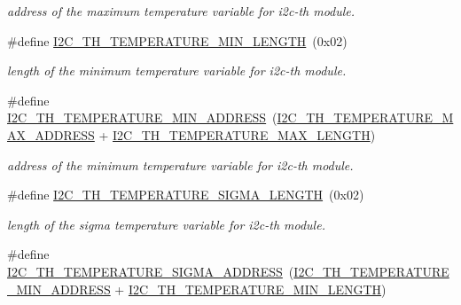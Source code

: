 \begin{DoxyCompactItemize}
\begin{DoxyCompactList}\small\item\em address of the maximum temperature variable for i2c-\/th module. \end{DoxyCompactList}\item 
\mbox{\label{registers-th_8h_a6d360f6fa8df3c5d6f52758de9a24c11}} 
\#define \hyperlink{registers-th_8h_a6d360f6fa8df3c5d6f52758de9a24c11}{I2\+C\+\_\+\+T\+H\+\_\+\+T\+E\+M\+P\+E\+R\+A\+T\+U\+R\+E\+\_\+\+M\+I\+N\+\_\+\+L\+E\+N\+G\+TH}~(0x02)
\begin{DoxyCompactList}\small\item\em length of the minimum temperature variable for i2c-\/th module. \end{DoxyCompactList}\item 
\mbox{\label{registers-th_8h_a7481bfd98d8da5c9977dfd2f06fc963c}} 
\#define \hyperlink{registers-th_8h_a7481bfd98d8da5c9977dfd2f06fc963c}{I2\+C\+\_\+\+T\+H\+\_\+\+T\+E\+M\+P\+E\+R\+A\+T\+U\+R\+E\+\_\+\+M\+I\+N\+\_\+\+A\+D\+D\+R\+E\+SS}~(\hyperlink{registers-th_8h_a6d5b14a0e8a228589bdb9ece79d757fd}{I2\+C\+\_\+\+T\+H\+\_\+\+T\+E\+M\+P\+E\+R\+A\+T\+U\+R\+E\+\_\+\+M\+A\+X\+\_\+\+A\+D\+D\+R\+E\+SS} + \hyperlink{registers-th_8h_a919ba5b2f1aea01d8b48ac119d705552}{I2\+C\+\_\+\+T\+H\+\_\+\+T\+E\+M\+P\+E\+R\+A\+T\+U\+R\+E\+\_\+\+M\+A\+X\+\_\+\+L\+E\+N\+G\+TH})
\begin{DoxyCompactList}\small\item\em address of the minimum temperature variable for i2c-\/th module. \end{DoxyCompactList}\item 
\mbox{\label{registers-th_8h_adb95f4cc071476c164346dc15de2dd1a}} 
\#define \hyperlink{registers-th_8h_adb95f4cc071476c164346dc15de2dd1a}{I2\+C\+\_\+\+T\+H\+\_\+\+T\+E\+M\+P\+E\+R\+A\+T\+U\+R\+E\+\_\+\+S\+I\+G\+M\+A\+\_\+\+L\+E\+N\+G\+TH}~(0x02)
\begin{DoxyCompactList}\small\item\em length of the sigma temperature variable for i2c-\/th module. \end{DoxyCompactList}\item 
\mbox{\label{registers-th_8h_a13174bfc9826a2360b3a9ef42c682415}} 
\#define \hyperlink{registers-th_8h_a13174bfc9826a2360b3a9ef42c682415}{I2\+C\+\_\+\+T\+H\+\_\+\+T\+E\+M\+P\+E\+R\+A\+T\+U\+R\+E\+\_\+\+S\+I\+G\+M\+A\+\_\+\+A\+D\+D\+R\+E\+SS}~(\hyperlink{registers-th_8h_a7481bfd98d8da5c9977dfd2f06fc963c}{I2\+C\+\_\+\+T\+H\+\_\+\+T\+E\+M\+P\+E\+R\+A\+T\+U\+R\+E\+\_\+\+M\+I\+N\+\_\+\+A\+D\+D\+R\+E\+SS} + \hyperlink{registers-th_8h_a6d360f6fa8df3c5d6f52758de9a24c11}{I2\+C\+\_\+\+T\+H\+\_\+\+T\+E\+M\+P\+E\+R\+A\+T\+U\+R\+E\+\_\+\+M\+I\+N\+\_\+\+L\+E\+N\+G\+TH})

\end{DoxyCompactItemize}
